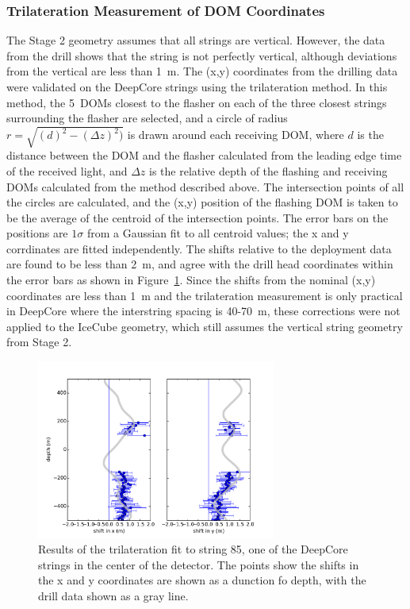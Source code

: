 \subsubsection{Trilateration Measurement of DOM Coordinates}
The Stage 2 geometry assumes that all strings are vertical. However, the data from the drill shows that the string is not perfectly vertical, although deviations from the vertical are less than 1~m. The (x,y) coordinates from the drilling data were validated on the DeepCore strings using the
trilateration method. In this method, the 5~DOMs closest to the
flasher on each of the three closest strings surrounding the flasher are selected,
and a circle of radius $r = \sqrt{(d)^2 - (\Delta z)^2)}$ is drawn
around each receiving DOM, where $d$ is the distance between the DOM and the flasher calculated from the leading edge time of the received
light, and  $\Delta z$ is the relative depth of the flashing and
receiving DOMs calculated from the method described above. The
intersection points of all the circles are calculated, and the (x,y)
position of the flashing DOM is taken to be the average of the
centroid of the intersection points. The error bars on the positions
are $1 \sigma$ from a Gaussian fit to all centroid values; the x and y
corrdinates are fitted independently. The shifts relative to the
deployment data are found to be less than 2~m, and agree with the
drill head coordinates within the error bars as shown in Figure~\ref{fig:trilateration}. Since the shifts from the nominal (x,y) coordinates are less than 1~m and the trilateration measurement is only practical in DeepCore where the interstring spacing is 40-70~m, these corrections were not applied to the IceCube geometry, which still assumes the vertical string geometry from Stage 2.

\begin{figure}[!h]
 \centering
\includegraphics[width=0.7\textwidth]{graphics/geometry/newtrilat85.pdf}
\caption{Results of the trilateration fit to string 85, one of the DeepCore strings in the center of the detector. The points show the shifts in the x and y coordinates are shown as a dunction fo depth, with the drill data shown as a gray line.}
\label{fig:trilateration}
\end{figure}


